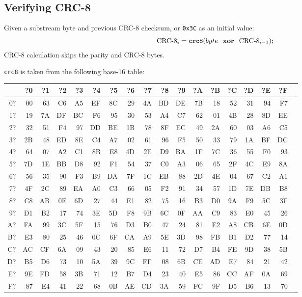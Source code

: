 \subsection{Verifying CRC-8}
\label{mlp:verify_crc}
Given a substream byte and previous CRC-8 checksum,
or \texttt{0x3C} as an initial value:
\begin{equation*}
\text{CRC-8}_i = \texttt{crc8}(byte~\textbf{ xor }~\text{CRC-8}_{i - 1});
\end{equation*}
CRC-8 calculation skips the parity and CRC-8 bytes.
\par
\noindent
\texttt{crc8} is taken from the following base-16 table:
\begin{table}[h]
  {\ttfamily
    \begin{tabular}{|r||r|r|r|r|r|r|r|r|r|r|r|r|r|r|r|r|r|}
      \hline
      & ?0 & ?1 & ?2 & ?3 & ?4 & ?5 & ?6 & ?7 & ?8 & ?9 & ?A & ?B & ?C & ?D & ?E & ?F \\
      \hline
      0? & 00 & 63 & C6 & A5 & EF & 8C & 29 & 4A & BD & DE & 7B & 18 & 52 & 31 & 94 & F7 \\
      1? & 19 & 7A & DF & BC & F6 & 95 & 30 & 53 & A4 & C7 & 62 & 01 & 4B & 28 & 8D & EE \\
      2? & 32 & 51 & F4 & 97 & DD & BE & 1B & 78 & 8F & EC & 49 & 2A & 60 & 03 & A6 & C5 \\
      3? & 2B & 48 & ED & 8E & C4 & A7 & 02 & 61 & 96 & F5 & 50 & 33 & 79 & 1A & BF & DC \\
      4? & 64 & 07 & A2 & C1 & 8B & E8 & 4D & 2E & D9 & BA & 1F & 7C & 36 & 55 & F0 & 93 \\
      5? & 7D & 1E & BB & D8 & 92 & F1 & 54 & 37 & C0 & A3 & 06 & 65 & 2F & 4C & E9 & 8A \\
      6? & 56 & 35 & 90 & F3 & B9 & DA & 7F & 1C & EB & 88 & 2D & 4E & 04 & 67 & C2 & A1 \\
      7? & 4F & 2C & 89 & EA & A0 & C3 & 66 & 05 & F2 & 91 & 34 & 57 & 1D & 7E & DB & B8 \\
      8? & C8 & AB & 0E & 6D & 27 & 44 & E1 & 82 & 75 & 16 & B3 & D0 & 9A & F9 & 5C & 3F \\
      9? & D1 & B2 & 17 & 74 & 3E & 5D & F8 & 9B & 6C & 0F & AA & C9 & 83 & E0 & 45 & 26 \\
      A? & FA & 99 & 3C & 5F & 15 & 76 & D3 & B0 & 47 & 24 & 81 & E2 & A8 & CB & 6E & 0D \\
      B? & E3 & 80 & 25 & 46 & 0C & 6F & CA & A9 & 5E & 3D & 98 & FB & B1 & D2 & 77 & 14 \\
      C? & AC & CF & 6A & 09 & 43 & 20 & 85 & E6 & 11 & 72 & D7 & B4 & FE & 9D & 38 & 5B \\
      D? & B5 & D6 & 73 & 10 & 5A & 39 & 9C & FF & 08 & 6B & CE & AD & E7 & 84 & 21 & 42 \\
      E? & 9E & FD & 58 & 3B & 71 & 12 & B7 & D4 & 23 & 40 & E5 & 86 & CC & AF & 0A & 69 \\
      F? & 87 & E4 & 41 & 22 & 68 & 0B & AE & CD & 3A & 59 & FC & 9F & D5 & B6 & 13 & 70 \\
      \hline
    \end{tabular}
  }
\end{table}


